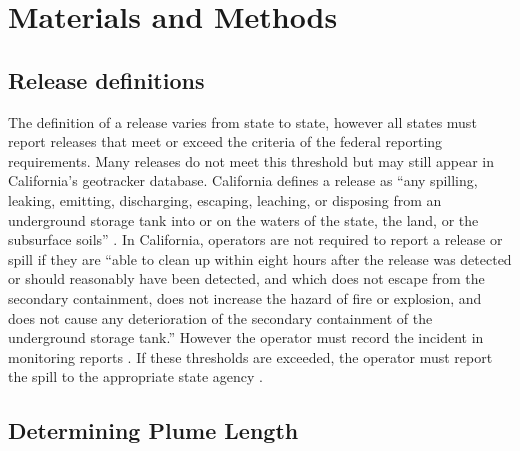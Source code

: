 \documentclass[draft,linenumbers]{agujournal2018}
\begin{document}
\section{Materials and Methods}

\subsection{Release definitions}

The definition of a release varies from state to state, however all
states must report releases that meet or exceed the criteria of the
federal reporting requirements. Many releases do not meet this threshold
but may still appear in California's geotracker database. California
defines a release as ``any spilling, leaking, emitting, discharging,
escaping, leaching, or disposing from an underground storage tank into
or on the waters of the state, the land, or the subsurface soils''
\citep{careport25295.5}. In California, operators are not required to
report a release or spill if they are ``able to clean up within eight
hours after the release was detected or should reasonably have been
detected, and which does not escape from the secondary containment, does
not increase the hazard of fire or explosion, and does not cause any
deterioration of the secondary containment of the underground storage
tank.'' However the operator must record the incident in monitoring
reports \citep{careport25294}. If these thresholds are exceeded, the
operator must report the spill to the appropriate state agency
\citep{careport25295}.

\subsection{Determining Plume Length}
\end{document}
